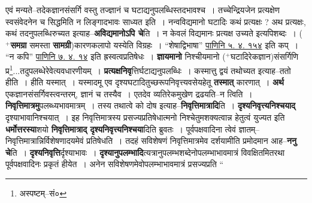 \documentclass[article,12pt,a4paper]{memoir}
\newcommand{\add}[1]{($^{+}$#1)}
\begin{document}
	  \pstart एवं मन्यते--तदेकज्ञानसंसर्गि वस्तु तज्ज्ञानं च घटाद्यनुपलब्धिस्तदभावश्च । तच्चेन्द्रियजेन प्रत्यक्षेण स्वसंवेदनेन च सिद्धमिति न लिङ्गादभावः साध्यत इति । नन्वविद्यमानो घटादिः कथं प्रत्यक्षः ? अथ प्रत्यक्षः, कथं तदनुपलब्धिरुच्यत इत्याह--\textbf{अविद्यमानोऽपि चे}ति । न केवलं विद्यमानः प्रत्यक्ष उच्यते इत्यपिशब्दः । \add{\textbf{समग्रा} समस्ता \textbf{सामग्री}}कारणकलापो यस्येति विग्रहः । “शेषाद्विभाषा” \href{http://http://sarit.indology.info/?cref=Pā.5.4.154}{पाणिनि ५. ४. १५४} इति कप् । “न कपि” \href{http://http://sarit.indology.info/?cref=Pā.7.4.14}{पाणिनि ७. ४. १४} इति ह्रस्वत्वप्रतिषेधः । \textbf{ज्ञायमानो} निश्चीयमानो \add{घटादिरेकज्ञान}संसर्गिणि प्र\footnote{अस्पष्टम्--सं०}...तदुपलब्धेरेवेत्यवधारणीयम् । \textbf{प्रत्यक्षनिवृ}त्तिर्घटाद्यनुपलब्धिः । कस्मात्तु द्वयं तथोच्यत इत्याह--ततो हीति । हीति यस्मात् । यस्मादमू एव दृश्यघटादितुच्छरूपनिवृत्त्यवसेयहेतू \textbf{तस्मात्} कारणात् । \textbf{अर्थ} एकज्ञानसंसर्गिवस्त्वन्तरम्, ज्ञानं च तस्यैव । एतदेव व्यतिरेकमुखेण द्रढयति--न त्विति । \textbf{निवृत्तिमात्रमु}पलब्ध्यभावमात्रम् । तस्य तथात्वे को दोष इत्याह--\textbf{निवृत्तिमात्रादि}ति । \textbf{दृश्यनिवृत्त्यनिश्चयाद्} दृश्याभावानिश्चयात् । इह निवृत्तिमात्रस्य प्रसज्यप्रतिषेधात्मनो निश्चेतुमशक्यत्वान्न हेतुत्वं युज्यत इति \textbf{धर्मोत्तरस्या}शयो \textbf{निवृत्तिमात्राद् दृश्यनिवृत्त्यनिश्चया}दिति ब्रुवतः । पूर्वपक्षवादिना त्वेवं ज्ञातम्--निवृत्तिमात्रान्निर्विशेषणादयमेवं प्रतिषेधति । तदहं सविशेषणं निवृत्तिमात्रमेव दर्शयामीति प्रमोदमान आह--\textbf{ननु चे}ति । \textbf{दृश्यनिवृत्ति}र्दृश्याभावः । \textbf{दृश्यानुपलम्भादि}त्यत्रानुपलम्भशब्देनोपलम्भाभावमात्रं विवक्षितमितरथा पूर्वपक्षवादिनः प्रकृतं हीयेत । अनेन सविशेषणमेवोपलम्भाभावमात्रं प्रसज्यप्रति  \leavevmode{} “
	  
\end{document}

